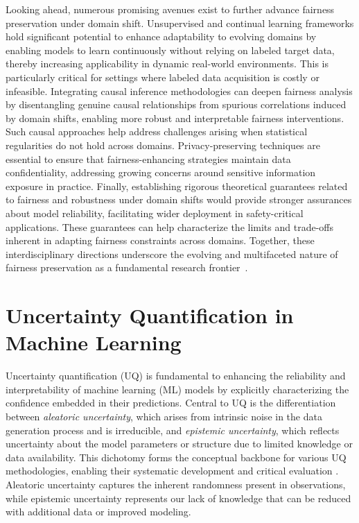 \documentclass[sigconf]{acmart}
\begin{document}
Looking ahead, numerous promising avenues exist to further advance fairness preservation under domain shift. Unsupervised and continual learning frameworks hold significant potential to enhance adaptability to evolving domains by enabling models to learn continuously without relying on labeled target data, thereby increasing applicability in dynamic real-world environments. This is particularly critical for settings where labeled data acquisition is costly or infeasible. Integrating causal inference methodologies can deepen fairness analysis by disentangling genuine causal relationships from spurious correlations induced by domain shifts, enabling more robust and interpretable fairness interventions. Such causal approaches help address challenges arising when statistical regularities do not hold across domains. Privacy-preserving techniques are essential to ensure that fairness-enhancing strategies maintain data confidentiality, addressing growing concerns around sensitive information exposure in practice. Finally, establishing rigorous theoretical guarantees related to fairness and robustness under domain shifts would provide stronger assurances about model reliability, facilitating wider deployment in safety-critical applications. These guarantees can help characterize the limits and trade-offs inherent in adapting fairness constraints across domains. Together, these interdisciplinary directions underscore the evolving and multifaceted nature of fairness preservation as a fundamental research frontier~\cite{ref26}.

\section{Uncertainty Quantification in Machine Learning}

Uncertainty quantification (UQ) is fundamental to enhancing the reliability and interpretability of machine learning (ML) models by explicitly characterizing the confidence embedded in their predictions. Central to UQ is the differentiation between \emph{aleatoric uncertainty}, which arises from intrinsic noise in the data generation process and is irreducible, and \emph{epistemic uncertainty}, which reflects uncertainty about the model parameters or structure due to limited knowledge or data availability. This dichotomy forms the conceptual backbone for various UQ methodologies, enabling their systematic development and critical evaluation \cite{ref28}. Aleatoric uncertainty captures the inherent randomness present in observations, while epistemic uncertainty represents our lack of knowledge that can be reduced with additional data or improved modeling.
\end{document}
